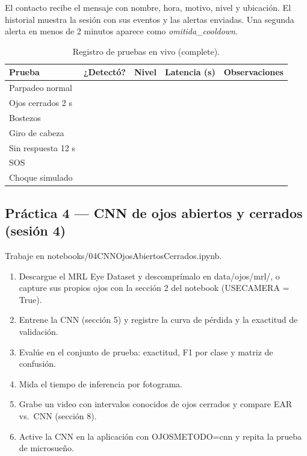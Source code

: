 \documentclass[11pt,a4paper]{article}
\newcommand{\codigoguion}{\textunderscore\allowbreak}
\newcommand{\codigo}[1]{{\small\ttfamily\let\_\codigoguion #1}}
\begin{document}
\begin{verificacion}
El contacto recibe el mensaje con nombre, hora, motivo, nivel y ubicación. El historial muestra la sesión
con sus eventos y las alertas enviadas. Una segunda alerta en menos de 2 minutos aparece como
\emph{omitida\_cooldown}.
\end{verificacion}

\begin{table}[H]
\centering
\caption{Registro de pruebas en vivo (complete).}
\begin{tabularx}{\textwidth}{X c c c X}
\toprule
\textbf{Prueba} & \textbf{¿Detectó?} & \textbf{Nivel} & \textbf{Latencia (s)} & \textbf{Observaciones}\\
\midrule
Parpadeo normal & & & & \\
Ojos cerrados 2 s & & & & \\
Bostezos & & & & \\
Giro de cabeza & & & & \\
Sin respuesta 12 s & & & & \\
SOS & & & & \\
Choque simulado & & & & \\
\bottomrule
\end{tabularx}
\end{table}

\subsection{Práctica 4 — CNN de ojos abiertos y cerrados (sesión 4)}
Trabaje en \codigo{notebooks/04\_CNN\_Ojos\_Abiertos\_Cerrados.ipynb}.
\begin{enumerate}
  \item Descargue el MRL Eye Dataset \cite{fusek2018} y descomprímalo en \codigo{data/ojos/mrl/}, o capture
        sus propios ojos con la sección 2 del notebook (\codigo{USE\_CAMERA = True}).
  \item Entrene la CNN (sección 5) y registre la curva de pérdida y la exactitud de validación.
  \item Evalúe en el conjunto de prueba: exactitud, F1 por clase y matriz de confusión.
  \item Mida el tiempo de inferencia por fotograma.
  \item Grabe un video con intervalos conocidos de ojos cerrados y compare EAR vs.\ CNN (sección 8).
  \item Active la CNN en la aplicación con \codigo{OJOS\_METODO=cnn} y repita la prueba de microsueño.
\end{enumerate}
\end{document}

